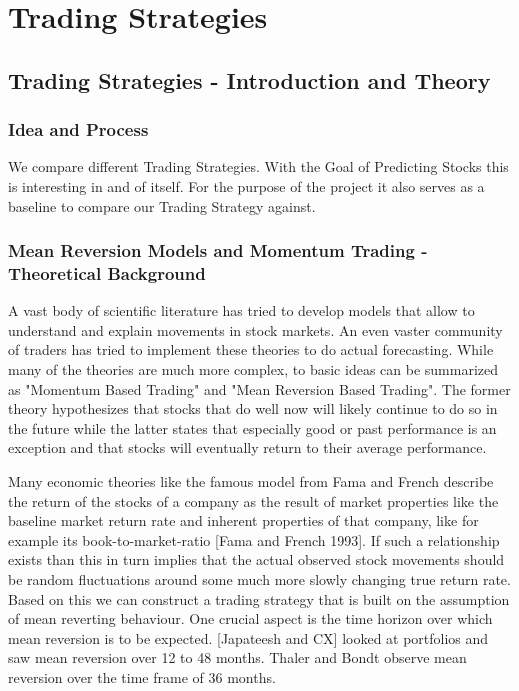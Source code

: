 \chapter{Trading Strategies}\label{ch:predictions}

\section{Trading Strategies - Introduction and Theory}
\subsection{Idea and Process}
We compare different Trading Strategies. With the Goal of Predicting Stocks this is interesting in and of itself. For the purpose of the project it also serves as a baseline to compare our Trading Strategy against. 

\subsection{Mean Reversion Models and Momentum Trading - Theoretical Background}

A vast body of scientific literature has tried to develop models that allow to understand and explain movements in stock markets. An even vaster community of traders has tried to implement these theories to do actual forecasting. While many of the theories are much more complex, to basic ideas can be summarized as "Momentum Based Trading" and "Mean Reversion Based Trading". The former theory hypothesizes that stocks that do well now will likely continue to do so in the future while the latter states that especially good or past performance is an exception and that stocks will eventually return to their average performance. 



Many economic theories like the famous model from Fama and French describe the return of the stocks of a company as the result of market properties like the baseline market return rate and inherent properties of that company, like for example its book-to-market-ratio [Fama and French 1993]. If such a relationship exists than this in turn implies that the actual observed stock movements should be random fluctuations around some much more slowly changing true return rate. Based on this we can construct a trading strategy that is built on the assumption of mean reverting behaviour. 
One crucial aspect is the time horizon over which mean reversion is to be expected. [Japateesh and CX] looked at portfolios and saw mean reversion over 12 to 48 months. Thaler and Bondt observe mean reversion over the time frame of 36 months. 


